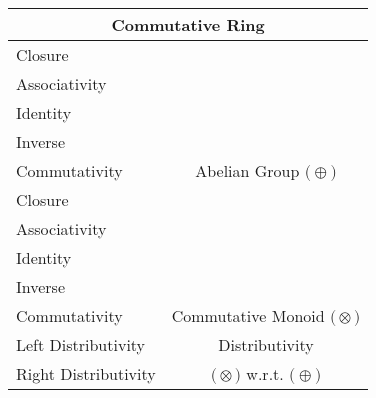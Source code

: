 \documentclass[a4paper,12pt]{scrartcl}    %
\newcommand{\OpA}{\otimes}
\newcommand{\OpB}{\oplus}
\begin{document}
\begin{minipage}[c]{0,5\textwidth}

\begin{tabular}{|l|c|} %
  \hline
  \multicolumn{2}{c}{\cellcolor{green!25}Commutative Ring} \\
  \hline
    \cellcolor{blue!25} Closure& \cellcolor{yellow!25}  \\
    \cellcolor{blue!25} Associativity& \cellcolor{yellow!25}  \\
    \cellcolor{blue!25} Identity& \cellcolor{yellow!25} \\
    \cellcolor{blue!25} Inverse& \cellcolor{yellow!25} \\
    \cellcolor{blue!25} Commutativity& \multirow{-5}{*}{\tiny\cellcolor{yellow!25}Abelian Group $\big(\OpB\big)$} \\
   \hline
    \cellcolor{blue!25} Closure& \cellcolor{yellow!25}  \\
    \cellcolor{blue!25} Associativity& \cellcolor{yellow!25}  \\
    \cellcolor{blue!25} Identity& \cellcolor{yellow!25} \\
    \cellcolor{red!25} Inverse& \cellcolor{yellow!25} \\
    \cellcolor{blue!25} Commutativity& \multirow{-5}{*}{\cellcolor{yellow!25}\tiny Commutative Monoid $\big(\OpA\big)$} \\
  \hline
  	\cellcolor{blue!25} Left Distributivity&  \tiny\cellcolor{yellow!25}Distributivity\\
    \cellcolor{blue!25} Right Distributivity & \tiny\cellcolor{yellow!25} $\big(\OpA\big)$ w.r.t. $\big(\OpB\big)$  \\
   \hline
\end{tabular}


\end{minipage}
\end{document}
